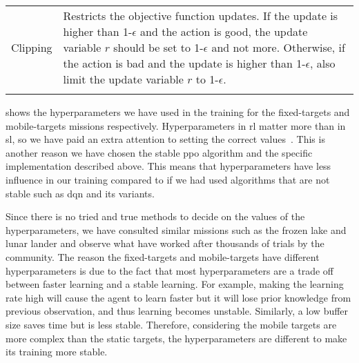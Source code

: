 \documentclass[../main.tex]{subfiles}
\begin{document}
\begin{table}[H]
\begin{tabularx}{\textwidth}{ X p{12.3cm} }
        Clipping
                & 
                Restricts the objective function updates.
                If the update is higher than 1-$\epsilon$ and the
                action is good, the update variable $r$ should be set
                to 1-$\epsilon$ and not more.
                Otherwise, if the action is bad and the update is
                higher than 1-$\epsilon$, also limit the update
                variable $r$ to 1-$\epsilon$.
                \\ \addlinespace
        
        \bottomrule
    \end{tabularx}
\end{table}

 shows the hyperparameters we have used in
the training for the fixed-targets and mobile-targets missions
respectively.
Hyperparameters in \gls{rl} matter more than in \gls{sl}, so we have
paid an extra attention to setting the correct
values~\cite{hyperparameters}.
This is another reason we have chosen the stable \gls{ppo}
algorithm and the specific implementation described above.
This means that hyperparameters have less influence in our training
compared to if we had used algorithms that are not stable such as 
\gls{dqn} and its variants.

Since there is no tried and true methods to decide on the values of
the hyperparameters,  we have consulted similar missions such as the frozen
lake and lunar lander and observe what have worked after thousands of
trials by the community.
The reason the fixed-targets and mobile-targets have different
hyperparameters is due to the fact that
most hyperparameters are a trade off between faster learning and a
stable learning.
For example, making the learning rate high will cause the agent to
learn faster but it will lose prior knowledge from previous
observation, and thus learning becomes unstable.
Similarly, a low buffer size saves time but is less stable. 
Therefore, considering the mobile targets are more complex than the
static targets, the hyperparameters are different to make its training
more stable.
\end{document}
